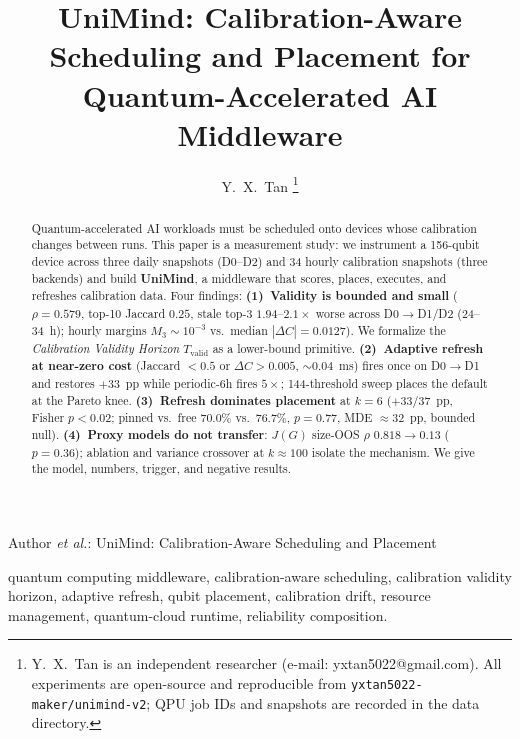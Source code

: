 \documentclass[journal,10pt,twocolumn]{IEEEtran}
\begin{document}
\title{UniMind: Calibration-Aware Scheduling and Placement for Quantum-Accelerated AI Middleware}

\author{Y.~X.~Tan%
\thanks{Y.~X.~Tan is an independent researcher (e-mail: yxtan5022@gmail.com). All experiments are open-source and
reproducible from \texttt{yxtan5022-maker/unimind-v2}; QPU job IDs and snapshots are recorded in the data directory.}}

%
{Author \MakeLowercase{\textit{et al.}}: UniMind: Calibration-Aware Scheduling and Placement}

\maketitle

\begin{abstract}
Quantum-accelerated AI workloads must be scheduled onto devices whose calibration changes between runs.
This paper is a measurement study: we instrument a 156-qubit device across three daily snapshots
(D0--D2) and 34 hourly calibration snapshots (three backends) and build \textbf{UniMind}, a middleware
that scores, places, executes, and refreshes calibration data. Four findings: \textbf{(1)~Validity is
bounded and small} ($\rho{=}0.579$, top-10 Jaccard $0.25$, stale top-3 $1.94$--$2.1\times$ worse
across D0$\to$D1/D2 (24--34~h); hourly margins $M_3\sim10^{-3}$ vs.\ median $|\Delta C|=0.0127$). We formalize the
\emph{Calibration Validity Horizon} $T_{\mathrm{valid}}$ as a lower-bound primitive. \textbf{(2)~Adaptive
refresh at near-zero cost} (Jaccard $<0.5$ or $\Delta C{>}0.005$, $\sim0.04$~ms) fires once on D0$\to$D1
and restores $+33$~pp while periodic-$6$h fires $5\times$; 144-threshold sweep places the default at
the Pareto knee. \textbf{(3)~Refresh dominates placement} at $k{=}6$ ($+33/37$~pp, Fisher $p{<}0.02$;
pinned vs.\ free $70.0\%$ vs.\ $76.7\%$, $p{=}0.77$, MDE $\approx32$~pp, bounded null).
\textbf{(4)~Proxy models do not transfer}: $J(G)$ size-OOS $\rho$ $0.818{\to}0.13$ ($p{=}0.36$); ablation
and variance crossover at $k\approx100$ isolate the mechanism. We give the model, numbers, trigger, and
negative results.
\end{abstract}

\begin{IEEEkeywords}
quantum computing middleware, calibration-aware scheduling, calibration validity horizon, adaptive refresh,
qubit placement, calibration drift, resource management, quantum-cloud runtime, reliability composition.
\end{IEEEkeywords}
\end{document}
